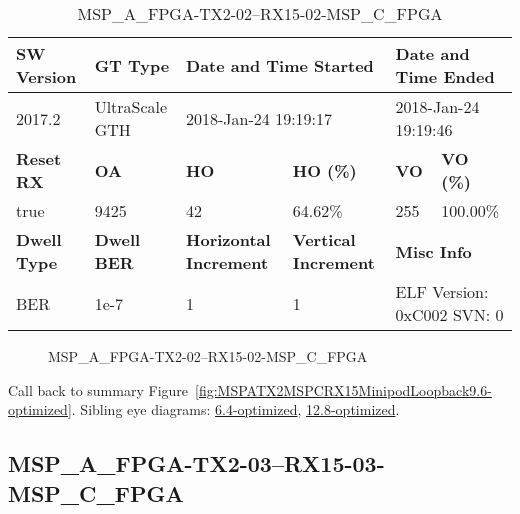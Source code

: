 \begin{table}[h]
\centering
\caption{MSP\_A\_FPGA-TX2-02--RX15-02-MSP\_C\_FPGA}
\label{tab:MSPAFPGATX202RX1502MSPCFPGA9.6-optimized}
\begin{tabular}{@{}|l|l|l|l|l|l|@{}}
\toprule
\textbf{SW Version}                & \textbf{GT Type}   & \multicolumn{2}{l|}{\textbf{Date and Time Started}}            & \multicolumn{2}{l|}{\textbf{Date and Time Ended}}        \\ \midrule
2017.2                       & UltraScale GTH          & \multicolumn{2}{l|}{2018-Jan-24 19:19:17}                   & \multicolumn{2}{l|}{2018-Jan-24 19:19:46}               \\ \midrule
\textbf{Reset RX}                  & \textbf{OA} & \textbf{HO}   & \textbf{HO (\%)} & \textbf{VO} & \textbf{VO (\%)} \\ \midrule
true & 9425        & 42          & 64.62\%        & 255        & 100.00\%       \\ \midrule
\textbf{Dwell Type}                & \textbf{Dwell BER} & \textbf{Horizontal Increment} & \textbf{Vertical Increment}    & \multicolumn{2}{l|}{\textbf{Misc Info}}                  \\ \midrule
BER                            & 1e-7        & 1        & 1           & \multicolumn{2}{l|}{ELF Version: 0xC002 SVN: 0}                         \\ \bottomrule
\end{tabular}
\end{table}

\begin{figure}[h]
\caption{MSP\_A\_FPGA-TX2-02--RX15-02-MSP\_C\_FPGA} \label{fig:MSPAFPGATX202RX1502MSPCFPGA9.6-optimized}
\end{figure}

Call back to summary Figure~\ref{fig:MSPATX2MSPCRX15MinipodLoopback9.6-optimized}.
Sibling eye diagrams: \hyperref[sec:MSPAFPGATX202RX1502MSPCFPGA6.4-optimized]{6.4-optimized}, \hyperref[sec:MSPAFPGATX202RX1502MSPCFPGA12.8-optimized]{12.8-optimized}.

\clearpage
\newpage


\subsection{MSP\_A\_FPGA-TX2-03--RX15-03-MSP\_C\_FPGA}\label{sec:MSPAFPGATX203RX1503MSPCFPGA9.6-optimized}

